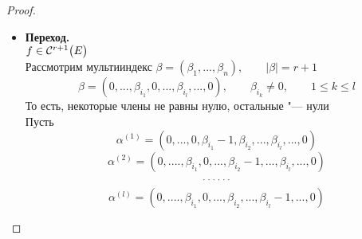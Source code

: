 \begin{proof}
\begin{itemize}
		Всё это означает, что , что
		\begin{equ}{r_order:15}
			g'(0) \iseq \sum_{\nu = 1}^n f_{x_\nu}'(Y) h_\nu
		\end{equ}
		По условию, $ f \in \Cont[1]{E} $, а значит, по достаточному условию, $ f $ диффер. в $ X \quad \forall X \in E $ \\
		Рассмотрим отображение
		$$ \Psi : (-a, a) \to \R^n, \qquad \Psi(t) = Y + tH $$
		$$ g(t) \bydef f(\Psi(t)), \qquad f : E \to \R^1 $$
		То есть, $ g : (-a, a) \to \R^1 $ и можно применить теорему о дифференцируемости суперпозиции дифференцируемых отображений:
		\begin{equ}{r_order:18}
			g(t) = f(V) \cdot \mathcal{D}\Psi(t)
		\end{equ}
		Матрица Якоби для отображения $ \R^1 \to \R^1 $ "--- матрица $ 1 \times 1 $:
		\begin{equ}{r_order:19'}
			g(t) = g'(t)
		\end{equ}
		$ f : \R^n \to \R^1 $, значит, её матрица Якоби "--- это вектор-строка:
		\begin{equ}{r_order:19}
			f(V) = \bigg( f_{x_1}'(Y + tH), \dots, f_{x_n}'(Y + tH) \bigg)
		\end{equ}
		\begin{equ}{r_order:20}
			\Psi(t) = \column{h_1}{h_n}
		\end{equ}
		\begin{equ}{r_order:21}
			, , ,  \implies g'(t) = \sum_{\nu = 1}^n f_{x_\nu}'(Y + tH)h_\nu, \qquad t \in (-a, a)
		\end{equ}
		Подставляя $ t = 0 $, получаем \eref{r_order:15}
		\item \textbf{Переход.} \\
		$ f \in \Cont[r + 1]E $ \\
		Рассмотрим мультииндекс $ \beta = (\beta_1, ..., \beta_n), \qquad |\beta| = r + 1 $
		$$ \beta = (0, ..., \beta_{i_1}, 0, ..., \beta_{i_l}, ..., 0), \qquad \beta_{i_k} \ne 0, \qquad 1 \le k \le l $$
		То есть, некоторые члены не равны нулю, остальные "--- нули \\
		Пусть
		$$ \alpha^{(1)} = (0, ..., 0, \beta_{i_1} - 1, \beta_{i_2}, ..., \beta_{i_l}, ..., 0) $$
		$$ \alpha^{(2)} = (0, ...., \beta_{i_1}, 0, ..., \beta_{i_2} - 1, ..., \beta_{i_l}, ..., 0) $$
		$$ \widedots $$
		$$ \alpha^{(l)} = (0, ...., \beta_{i_1}, 0, ..., \beta_{i_2}, ..., \beta_{i_l} - 1, ..., 0) $$

\end{itemize}
\end{proof}
